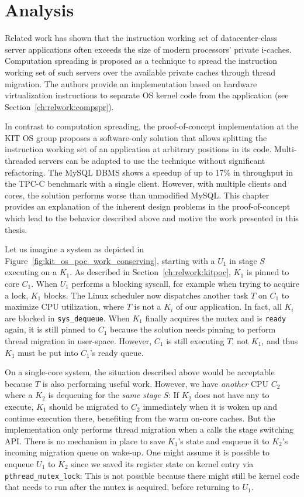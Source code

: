 \documentclass[12pt,a4paper]{book}
\begin{document}
\chapter{Analysis}\label{ch:analysis}
Related work has shown that the instruction working set of datacenter-class server applications often exceeds the size of modern processors' private i-caches.
Computation spreading is proposed as a technique to spread the instruction working set of such servers over the available private caches through thread migration.
The authors provide an implementation based on hardware virtualization instructions to separate OS kernel code from the application (see Section~\ref{ch:relwork:compspr}).

In contrast to computation spreading, the proof-of-concept implementation at the KIT OS group proposes a software-only solution that allows splitting the instruction working set of an application at arbitrary positions in its code.
Multi-threaded servers can be adapted to use the technique without significant refactoring.
The MySQL DBMS shows a speedup of up to 17\% in throughput in the TPC-C benchmark with a single client.
However, with multiple clients and cores, the solution performs worse than unmodified MySQL.
This chapter provides an explanation of the inherent design problems in the proof-of-concept which lead to the behavior described above and motive the work presented in this thesis.

Let us imagine a system as depicted in Figure~\ref{fig:kit_os_poc_work_conserving}, starting with a \ult $U_1$ in stage $S$ executing on a \klt $K_1$.
As described in Section~\ref{ch:relwork:kitpoc}, $K_1$ is pinned to core $C_1$.
When $U_1$ performs a blocking syscall, for example when trying to acquire a lock, $K_1$ blocks.
The Linux scheduler now dispatches another task $T$ on $C_1$ to maximize CPU utilization, where $T$ is not a $K_i$ of our application.
In fact, all $K_i$ are blocked in \texttt{sys\_dequeue}.
When $K_1$ finally acquires the mutex and is \texttt{ready} again, it is still pinned to $C_1$ because the solution needs pinning to perform thread migration in user-space.
However, $C_1$ is still executing $T$, not $K_1$, and thus $K_1$ must be put into $C_1$'s ready queue.

On a single-core system, the situation described above would be acceptable because $T$ is also performing useful work.
However, we have \emph{another} CPU $C_2$ where a \klt $K_2$ is dequeuing \ults for the \emph{same stage} $S$:
If $K_2$ does not have any \ults to execute, $K_1$ should be migrated to $C_2$ immediately when it is woken up and continue execution there, benefiting from the warm on-core caches.
But the implementation only performs thread migration when a \ult calls the stage switching API.
There is no mechanism in place to save $K_1$'s state and enqueue it to $K_2$'s incoming migration queue on wake-up.
One might assume it is possible to enqueue $U_1$ to $K_2$ since we saved its register state on kernel entry via \texttt{pthread\_mutex\_lock}:
This is not possible because there might still be kernel code that needs to run after the mutex is acquired, before returning to $U_1$.
\end{document}

